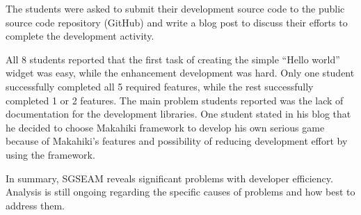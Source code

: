 The students were asked to submit their development source code to the
public source code repository (GitHub) and write a blog post to
discuss their efforts to complete the development activity.

All 8 students reported that the first task of creating the simple ``Hello world'' widget
was easy, while the enhancement development was hard. Only one student successfully
completed all 5 required features, while the rest successfully completed 1 or 2
features. The main problem students reported was the lack of documentation for the
development libraries. One student stated in his blog that he decided to choose Makahiki
framework to develop his own serious game because of Makahiki's features and possibility
of reducing development effort by using the framework.

In summary, SGSEAM reveals significant problems with developer efficiency.
Analysis is still ongoing regarding the specific causes of problems and how best to
address them.
